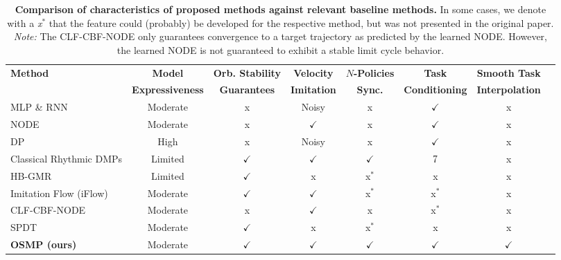 \begin{table}
    \centering
    \caption{\textbf{Comparison of characteristics of proposed methods against relevant baseline methods.} 
    In some cases, we denote with a \emph{x$^*$} that the feature could (probably) be developed for the respective method, but was not presented in the original paper.
    \emph{Note:} The CLF-CBF-NODE only guarantees convergence to a target trajectory as predicted by the learned NODE. However, the learned NODE is not guaranteed to exhibit a stable limit cycle behavior.
    }
    \label{tab:osmp:osmp_characteristics_vs_baselines} %
    \begin{scriptsize}
    \setlength\tabcolsep{2.0pt}
    \begin{tabular}{l ccccccc}\\
        \toprule
        \textbf{Method} & \textbf{Model} & \textbf{Orb. Stability} & \textbf{Velocity} & \textbf{$N$-Policies} & \textbf{Task} & \textbf{Smooth Task}\\
        & \textbf{Expressiveness} & \textbf{Guarantees} & \textbf{Imitation} & \textbf{Sync.} & \textbf{Conditioning} & \textbf{Interpolation}\\
        \midrule
        \gls{MLP} \& \gls{RNN} & Moderate & x & Noisy & x & $\checkmark$ & x\\
        \gls{NODE} & Moderate & x & $\checkmark$ & x & $\checkmark$ & x\\
        \gls{DP}~\citep{chi2023diffusion} & High & x & Noisy & x & $\checkmark$ & x\\
        Classical Rhythmic \glspl{DMP}  & Limited & $\checkmark$ & $\checkmark$ & $\checkmark$ & $\xmark$ & x\\
        HB-GMR~\citep{khadivar2021learning} & Limited & $\checkmark$ & x & x$^*$ & x & x\\
        Imitation Flow (iFlow)~\citep{urain2020imitationflow} & Moderate & $\checkmark$ &  $\checkmark$ & x$^*$ & x$^*$ & x\\
        CLF-CBF-NODE~\citep{nawaz2024learning} & Moderate & x & $\checkmark$ & x & x$^*$ & x\\
        \gls{SPDT}~\citep{zhi2024teaching} & Moderate & $\checkmark$ & x & x$^*$ & x & x\\
        \textbf{\gls{OSMP} (ours)} & Moderate & $\checkmark$ & $\checkmark$ & $\checkmark$ & $\checkmark$ & $\checkmark$\\
        \bottomrule
    \end{tabular}
    \end{scriptsize}
\end{table}